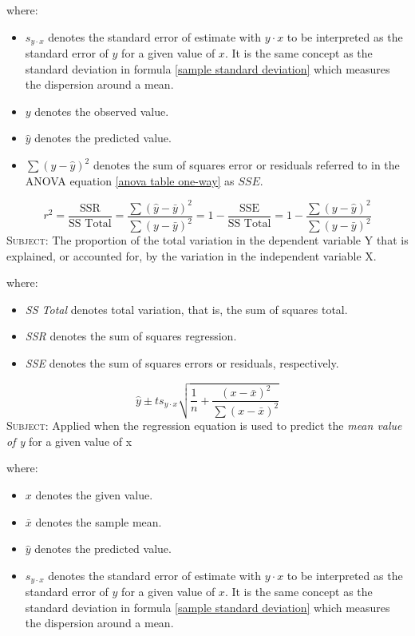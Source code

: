 where:
\begin{itemize}
 \item $s_{y \cdotp x}$ denotes the standard error of estimate with $y \cdotp x$ to be interpreted as the standard error of $y$ for a given value of $x$. It is the same concept as the standard deviation in formula \eqref{sample standard deviation} which measures the dispersion around a mean.
 \item $y$ denotes the observed value.
 \item $\hat{y}$ denotes the predicted value.
 \item $\sum(y-\hat{y})^2$ denotes the sum of squares error or residuals referred to in the ANOVA equation \eqref{anova table one-way} as $SSE$. 
\end{itemize}
\hformbar


\begin{equation}
\label{linear regression coefficient of determination}
r^2 = \frac{\text{SSR}}{\text{SS Total}} = \frac{\sum(\hat{y}-\bar{y})^2}{\sum(y-\bar{y})^2} =  1 - \frac{\text{SSE}}{\text{SS Total}} = 1 - \frac{\sum(y-\hat{y})^2}{\sum(y-\bar{y})^2}
\end{equation}
\textsc{Subject:} The proportion of the total variation in the dependent variable Y that is explained, or accounted for, by the variation in the independent variable X.

where:
\begin{itemize}
 \item \emph{SS Total} denotes total variation, that is, the sum of squares total.
 \item \emph{SSR} denotes the sum of squares regression.
 \item \emph{SSE} denotes the sum of squares errors or residuals, respectively.
\end{itemize}
\hformbar


\begin{equation}
\label{linear regression confidence interval}
\hat{y} \pm t s_{y \cdotp x}\sqrt{\frac{1}{n}+\frac{(x-\bar{x})^2}{\sum(x-\bar{x})^2}}
\end{equation}
\textsc{Subject:} Applied when the regression equation is used to predict the \emph{mean value of y} for a given value of x  

where:
\begin{itemize}
 \item $x$ denotes the given value.
 \item $\bar{x}$ denotes the sample mean.
 \item $\hat{y}$ denotes the predicted value. 
 \item $s_{y \cdotp x}$ denotes the standard error of estimate with $y \cdotp x$ to be interpreted as the standard error of $y$ for a given value of $x$. It is the same concept as the standard deviation in formula \eqref{sample standard deviation} which measures the dispersion around a mean.
\end{itemize}
\hformbar


